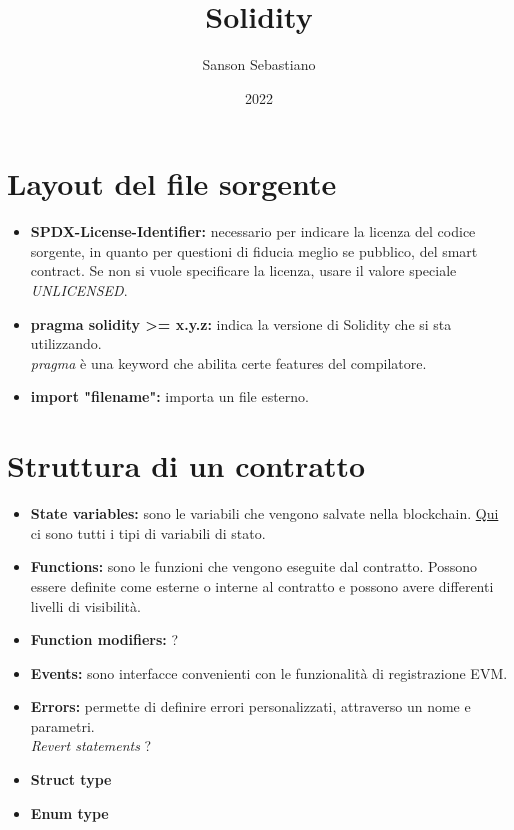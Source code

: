 \documentclass{article}
\title{\textbf{Solidity}}
\author{Sanson Sebastiano}
\date{2022}
\begin{document}
    \maketitle
    \tableofcontents
    \clearpage

    \section{Layout del file sorgente}
        \begin{itemize}
            \item \textbf{SPDX-License-Identifier:} necessario per indicare la licenza del codice sorgente, in quanto per questioni di fiducia meglio se pubblico, del smart contract.
            Se non si vuole specificare la licenza, usare il valore speciale \textit{UNLICENSED}.

            \item \textbf{pragma solidity \textgreater{}= x.y.z:} indica la versione di Solidity che si sta utilizzando. \\
            \textit{pragma} è una keyword che abilita certe features del compilatore.

            \item \textbf{import "filename":} importa un file esterno.
        \end{itemize}

    \section{Struttura di un contratto}
        \begin{itemize}
            \item \textbf{State variables:} sono le variabili che vengono salvate nella blockchain.
            \href{https://docs.soliditylang.org/en/v0.8.17/types.html#types}{Qui} ci sono tutti i tipi di variabili di stato.

            \item \textbf{Functions:} sono le funzioni che vengono eseguite dal contratto.
            Possono essere definite come esterne o interne al contratto e possono avere differenti livelli di visibilità.

            \item \textbf{Function modifiers:} ?

            \item \textbf{Events:} sono interfacce convenienti con le funzionalità di registrazione EVM.
            
            \item \textbf{Errors:} permette di definire errori personalizzati, attraverso un nome e parametri. \\
            \textit{Revert statements} ?
            
            \item \textbf{Struct type}

            \item \textbf{Enum type}
        \end{itemize}
\end{document}
